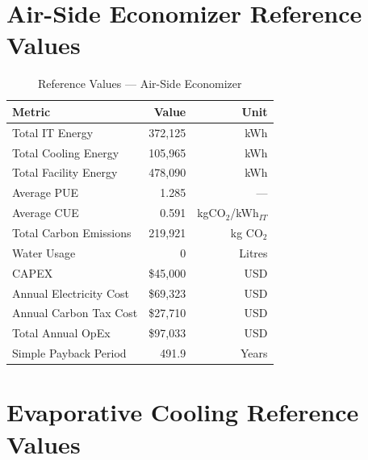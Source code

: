 \documentclass[12pt,a4paper]{report}
\begin{document}
\section{Air-Side Economizer Reference Values}

\begin{table}[H]
\centering
\caption{Reference Values --- Air-Side Economizer}
\label{tab:ref_air}
\renewcommand{\arraystretch}{1.3}
\begin{tabular}{lrr}
\toprule
\textbf{Metric} & \textbf{Value} & \textbf{Unit} \\
\midrule
Total IT Energy & 372{,}125 & kWh \\
Total Cooling Energy & 105{,}965 & kWh \\
Total Facility Energy & 478{,}090 & kWh \\
Average PUE & 1.285 & --- \\
Average CUE & 0.591 & kgCO$_2$/kWh$_{IT}$ \\
Total Carbon Emissions & 219{,}921 & kg CO$_2$ \\
Water Usage & 0 & Litres \\
CAPEX & \$45{,}000 & USD \\
Annual Electricity Cost & \$69{,}323 & USD \\
Annual Carbon Tax Cost & \$27{,}710 & USD \\
Total Annual OpEx & \$97{,}033 & USD \\
Simple Payback Period & 491.9 & Years \\
\bottomrule
\end{tabular}
\end{table}

\section{Evaporative Cooling Reference Values}
\end{document}
